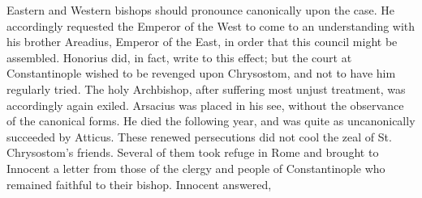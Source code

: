 Eastern and Western bishops should pronounce canonically upon the case. He accordingly requested the Emperor of the West to come to an understanding with his brother Areadius, Emperor of the East, in order that this council might be assembled. Honorius did, in fact, write to this effect; but the court at Constantinople wished to be revenged upon Chrysostom, and not to have him regularly tried. The holy Archbishop, after suffering most unjust treatment, was accordingly again exiled. Arsacius was placed in his see, without the observance of the canonical forms. He died the following year, and was quite as uncanonically succeeded by Atticus. These renewed persecutions did not cool the zeal of St. Chrysostom's friends. Several of them took refuge in Rome and brought to Innocent a letter from those of the clergy and people of Constantinople who remained faithful to their bishop. Innocent answered,

